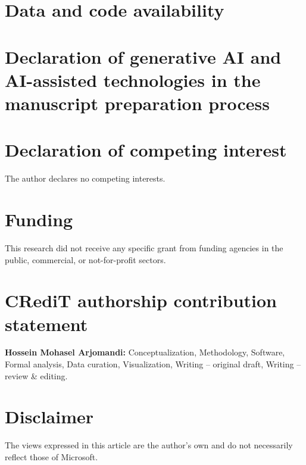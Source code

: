 \documentclass[preprint,12pt,authoryear]{elsarticle}
\newif\ifanon\anonfalse
\begin{document}




\section*{Data and code availability}\label{sec:availability}


\section*{Declaration of generative AI and AI-assisted technologies in the manuscript preparation process}


\section*{Declaration of competing interest}
The author declares no competing interests.

\section*{Funding}
This research did not receive any specific grant from funding agencies in the public, commercial, or not-for-profit
sectors.

\ifanon\else
\section*{CRediT authorship contribution statement}
\textbf{Hossein Mohasel Arjomandi:} Conceptualization, Methodology, Software, Formal analysis, Data curation,
Visualization, Writing -- original draft, Writing -- review \& editing.

\section*{Disclaimer}
The views expressed in this article are the author's own and do not necessarily reflect those of Microsoft.
\fi



\end{document}
